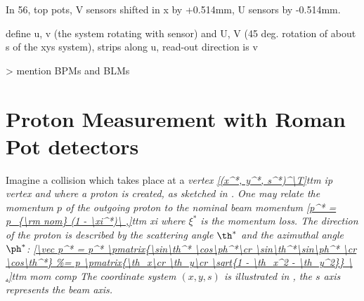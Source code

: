 
In 56, top pots, V sensors shifted in x by +0.514mm, U sensors by -0.514mm.

\> define u, v (the system rotating with sensor) and U, V (45 deg. rotation of about s of the xys system), strips along u, read-out direction is v


\>> mention BPMs and BLMs




\iffalse
\bmfig
\fig[8cm]{fig/external/RP_stations_original.pdf}{s}{[7cm]RP stations}
\fig[6cm]{fig/external/rp_unit.jpg}{rp unit}{[7cm]RP unit}
\emfig

\bmfig
\fig[6cm]{fig/external/rp.jpg}{rp rp}{[7cm]A Roman Pot}
\fig[6cm]{fig/external/rp_package.jpg}{rp package}{[7cm]Detector package}
\emfig

\bmfig
\fig[6cm]{fig/external/hybrid2.jpg}{rp hybrid}{[7cm]A hybrid with a silicon detector and four VFAT chips.}
\fig[6cm]{fig/external/silicon_explained.png}{rp sensor}{[7cm]A detail of a silicon sensor.}
\emfig
\fi

\section[rp measurement]{Proton Measurement with Roman Pot detectors}



Imagine a collision which takes place at a \em{vertex}
\eqref{(x^*, y^*, s^*)^\T}{ttm ip vertex}
and where a proton is created, as sketched in . One may relate the momentum $p$ of the outgoing proton to the nominal beam momentum
\eqref{p^* = p_{\rm nom} (1 - \xi^*)\ ,}{ttm xi}
where $\xi^*$ is the \em{momentum loss}. The direction of the proton is described by the \em{scattering angle} $\th^*$ and the \em{azimuthal angle} $\ph^*$:
\eqref{\vec p^* = p^* \pmatrix{\sin\th^* \cos\ph^*\cr \sin\th^*\sin\ph^* \cr \cos\th^*}
\ .}{ttm mom comp}
The coordinate system $(x, y, s)$ is illustrated in , the $s$ axis represents the beam axis.

